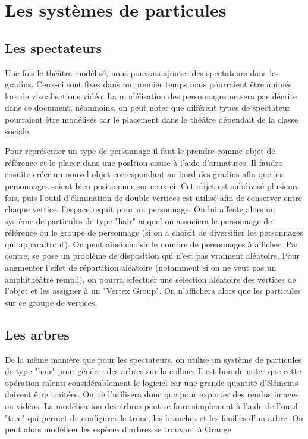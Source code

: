\section{Les systèmes de \glspl{particule}}
\subsection{Les spectateurs}
Une fois le théâtre modélisé, nous pouvons ajouter des spectateurs dans les gradins. Ceux-ci sont fixes dans un premier temps mais pourraient être animés lors de visualisations vidéo. La modélisation des personnages ne sera pas décrite dans ce document, néanmoins, on peut noter que différent types de spectateur pourraient être modélisés car le placement dans le théâtre dépendait de la classe sociale.

Pour représenter un type de personnage il faut le prendre comme objet de référence et le placer dans une posItion assise à l'aide d'\glspl{armature}. Il faudra ensuite créer un nouvel objet correspondant au bord des gradins afin que les personnages soient bien positionner sur ceux-ci. Cet objet est subdivisé plusieurs fois, puis l'outil d'élimination de double vertices est utilisé afin de conserver entre chaque vertice, l'espace requit pour un personnage. On lui affecte alors un système de \glspl{particule} de type "hair" auquel on associera le personnage de référence ou le groupe de personnage (si on a choisit de diversifier les personnages qui apparaitront). On peut ainsi choisir le nombre de personnages à afficher. Par contre, se pose un problème de disposition qui n'est pas vraiment aléatoire. Pour augmenter l'effet de répartition aléatoire (notamment si on ne veut pas un amphithéâtre rempli), on pourra effectuer une sélection aléatoire des vertices de l'objet et les assigner à un "Vertex Group". On n'affichera alors que les particules sur ce groupe de vertices. 


\subsection{Les arbres}
De la même manière que pour les spectateurs, on utilise un système de \glspl{particule} de type "hair" pour générer des arbres sur la colline. Il est bon de noter que cette opération ralenti considérablement le logiciel car une grande quantité d'éléments doivent être traitées. On ne l'utilisera donc que pour exporter des rendus images ou vidéos. La modélisation des arbres peut se faire simplement à l'aide de l'outil "tree" qui permet de configurer le tronc, les branches et les feuilles d'un arbre. On peut alors modéliser les espèces d'arbres se trouvant à Orange.


